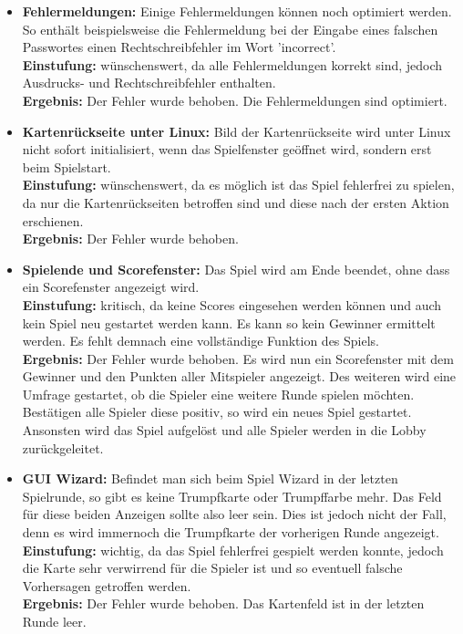 \documentclass[a4paper]{article}
\begin{document}
\begin{itemize}
	\item \textbf{Fehlermeldungen:} Einige Fehlermeldungen können noch optimiert werden. So enthält beispielsweise die 			Fehlermeldung bei der Eingabe eines falschen Passwortes einen Rechtschreibfehler im Wort 'incorrect'. \\
	\textbf{Einstufung:} wünschenswert, da alle Fehlermeldungen korrekt sind, jedoch Ausdrucks- und Rechtschreibfehler enthalten.\\
	\textbf{Ergebnis:} Der Fehler wurde behoben. Die Fehlermeldungen sind optimiert.\\
	
	\item \textbf{Kartenrückseite unter Linux:} Bild der Kartenrückseite wird unter Linux nicht sofort initialisiert, wenn das 			Spielfenster geöffnet wird, sondern erst beim Spielstart. \\
	\textbf{Einstufung:} wünschenswert, da es möglich ist das Spiel fehlerfrei zu spielen, da nur die Kartenrückseiten betroffen sind und diese nach der ersten Aktion erschienen.\\
	\textbf{Ergebnis:} Der Fehler wurde behoben.\\
	
	\item \textbf{Spielende und Scorefenster:}  Das Spiel wird am Ende beendet, ohne dass ein Scorefenster angezeigt wird.\\
	\textbf{Einstufung:} kritisch, da keine Scores eingesehen werden können und auch kein Spiel neu gestartet werden kann. Es kann so kein Gewinner ermittelt werden. Es fehlt demnach eine vollständige Funktion des Spiels.\\
	\textbf{Ergebnis:} Der Fehler wurde behoben. Es wird nun ein Scorefenster mit dem Gewinner und den Punkten aller Mitspieler angezeigt. Des weiteren wird eine Umfrage gestartet, ob die Spieler eine weitere Runde spielen möchten. Bestätigen alle Spieler diese positiv, so wird ein neues Spiel gestartet. Ansonsten wird das Spiel aufgelöst und alle Spieler werden in die 		Lobby zurückgeleitet.\\
	
	\item \textbf{GUI Wizard:} Befindet man sich beim Spiel Wizard in der letzten Spielrunde, so gibt es keine Trumpfkarte oder 	Trumpffarbe mehr. Das Feld für diese beiden Anzeigen sollte also leer sein. Dies ist jedoch nicht der Fall, denn es wird 			immernoch die Trumpfkarte der vorherigen Runde angezeigt.\\
	\textbf{Einstufung:} wichtig, da das Spiel fehlerfrei gespielt werden konnte, jedoch die Karte sehr verwirrend für die Spieler ist und so eventuell falsche Vorhersagen getroffen werden.\\
	\textbf{Ergebnis:} Der Fehler wurde behoben. Das Kartenfeld ist in der letzten Runde leer.\\
	\end{itemize}
	
\end{document}
